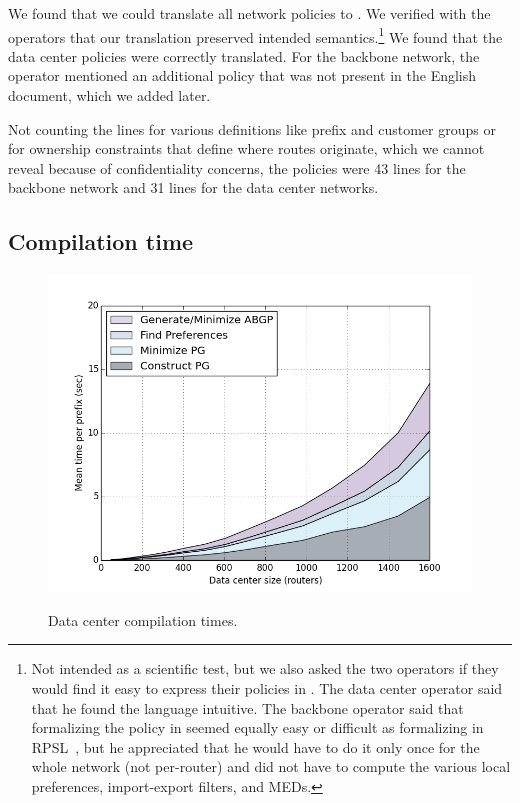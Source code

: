We found that we could translate all network policies to \sysname. We verified with the operators that our translation preserved intended semantics.\footnote{Not intended as a scientific test, but we also asked the two operators if they would find it easy to express their policies in \sysname. The data center operator said that he found the language intuitive. The backbone operator said that formalizing the policy in \sysname seemed equally easy or difficult as formalizing in RPSL~\cite{x}, but he appreciated that he would have to do it only once for the whole network (not per-router) and did not have to compute the various local preferences, import-export filters, and MEDs.} We found that the data center policies were correctly translated. For the backbone network, the operator mentioned an additional policy that was not present in the English document, which we added later.

Not counting the lines for various definitions like prefix and customer groups or for ownership constraints that define where routes originate, which we cannot reveal because of confidentiality concerns, the \sysname policies were 43 lines for the backbone network and 31 lines for the data center networks.

\subsection{Compilation time}

\begin{figure}[t!]
\centering
\includegraphics[width=\columnwidth]{figures/compilation-times-dc.png}
\label{fig:compilation-times-dc}
\caption{Data center compilation times.}
\end{figure}

